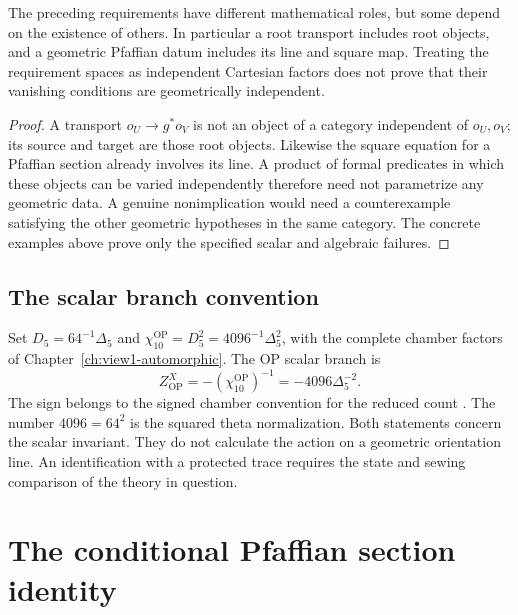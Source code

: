 \begin{proposition}
\label{prop:ch6-obstruction-independence}
The preceding requirements have different mathematical roles, but
some depend on the existence of others.  In particular a root
transport includes root objects, and a geometric Pfaffian datum
includes its line and square map.  Treating the requirement spaces
as independent Cartesian factors does not prove that their
vanishing conditions are geometrically independent.
\end{proposition}
\begin{proof}
A transport \(o_U\to g^*o_V\) is not an object of a category
independent of \(o_U,o_V\); its source and target are those root
objects.  Likewise the square equation for a Pfaffian section
already involves its line.  A product of formal predicates in
which these objects can be varied independently therefore need not
parametrize any geometric data.  A genuine nonimplication would
need a counterexample satisfying the other geometric hypotheses
in the same category.  The concrete examples above prove only the
specified scalar and algebraic failures.
\end{proof}

\subsection{The scalar branch convention}
\label{subsec:ch6-op-scalar-branch}

Set \(D_5=64^{-1}\Delta_5\) and
\(\chi_{10}^{\mathrm{OP}}=D_5^2=4096^{-1}\Delta_5^2\), with the
complete chamber factors of Chapter~\ref{ch:view1-automorphic}.
The OP scalar branch is
\[
 Z^X_{\mathrm{OP}}=-(\chi_{10}^{\mathrm{OP}})^{-1}
 =-4096\Delta_5^{-2}.
\]
The sign belongs to the signed chamber convention for the reduced
count \cite{OB}.  The number \(4096=64^2\) is the squared theta
normalization.  Both statements concern the scalar invariant.
They do not calculate the action on a geometric orientation line.
An identification with a protected trace requires the state and
sewing comparison of the theory in question.

\section{The conditional Pfaffian section identity}
\label{sec:ch6-pfaffian-dirac}

